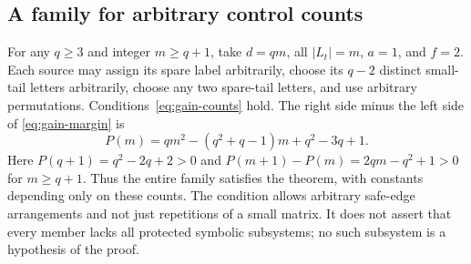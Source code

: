 \documentclass[11pt,reqno]{amsart}
\numberwithin{equation}{section}
\theoremstyle{definition}
\begin{document}
\subsection{A family for arbitrary control counts}
For any $q\ge3$ and integer $m\ge q+1$, take $d=qm$,
all $|L_t|=m$, $a=1$, and $f=2$. Each source may assign
its spare label arbitrarily, choose its $q-2$ distinct small-tail
letters arbitrarily, choose any two spare-tail letters, and use
arbitrary permutations. Conditions~\eqref{eq:gain-counts} hold.
The right side minus the left side of \eqref{eq:gain-margin} is
\[
 P(m)=qm^2-(q^2+q-1)m+q^2-3q+1.
\]
Here $P(q+1)=q^2-2q+2>0$ and
$P(m+1)-P(m)=2qm-q^2+1>0$ for $m\ge q+1$.
Thus the entire family satisfies the theorem, with constants
depending only on these counts. The condition allows arbitrary
safe-edge arrangements and not just repetitions of a small matrix.
It does not assert that every member lacks all protected symbolic
subsystems; no such subsystem is a hypothesis of the proof.
\end{document}

